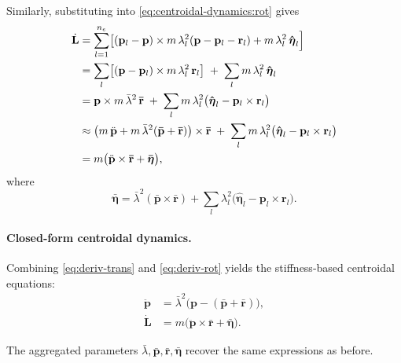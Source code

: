 \documentclass[main.tex]{subfiles}
\begin{document}
Similarly, substituting into \eqref{eq:centroidal‐dynamics:rot} gives
\begin{align}
\dot{\mathbf{L}}
&= \sum_{l=1}^{n_e}\bigl[(\mathbf{p}_l - \mathbf{p})\times m\,\lambda_l^2(\mathbf{p} - \mathbf{p}_l - \mathbf{r}_l) + m\,\lambda_l^2\,\mathbf{\hat{\boldsymbol{\eta}}}_l\Bigr]
\notag\\
&= \sum_{l}\bigl[(\mathbf{p} - \mathbf{p}_l)\times m\,\lambda_l^2\,\mathbf{r}_l\bigr]
   \;+\;\sum_{l}m\,\lambda_l^2\,\mathbf{\hat{\boldsymbol{\eta}}}_l
\notag\\
&= \mathbf{p} \times m\,\bar\lambda^2\,\mathbf{\bar{r}}
   \;+\;\sum_{l}m\,\lambda_l^2\bigl(\mathbf{\hat{\boldsymbol{\eta}}}_l - \mathbf{p}_l\times \mathbf{r}_l\bigr)
\notag\\
&\approx \bigl(m\,\ddot{\mathbf{p}} + m\,\bar\lambda^2(\mathbf{\bar{p}}+\mathbf{\bar{r}})\bigr)\times \mathbf{\bar{r}}
   \;+\;\sum_{l}m\,\lambda_l^2\bigl(\mathbf{\hat{\boldsymbol{\eta}}}_l - \mathbf{p}_l\times \mathbf{r}_l\bigr)
\notag\\
&= m\bigl(\ddot{\mathbf{p}}\times \mathbf{\bar{r}} + \mathbf{\bar{\boldsymbol{\eta}}}\bigr),
\label{eq:deriv‐rot}
\end{align}
where
\[
\mathbf{\bar{\boldsymbol{\eta}}}
= \bar\lambda^2(\mathbf{\bar{p}}\times \mathbf{\bar{r}})
  + \sum_{l}\lambda_l^2\bigl(\mathbf{\hat{\boldsymbol{\eta}}}_l - \mathbf{p}_l\times \mathbf{r}_l\bigr).
\]

\medskip
\paragraph{Closed‐form centroidal dynamics.}
Combining \eqref{eq:deriv‐trans} and \eqref{eq:deriv‐rot} yields the stiffness‐based centroidal equations:
\begin{subequations}\label{eq:stiff‐centroidal}
\begin{align}
\ddot{\mathbf{p}} &= \bar\lambda^2\bigl(\mathbf{p} - (\mathbf{\bar{p}} + \mathbf{\bar{r}})\bigr),
\label{eq:stiff‐centroidal:trans}\\
\dot{\mathbf{L}} &= m\bigl(\ddot{\mathbf{p}} \times \mathbf{\bar{r}} + \mathbf{\bar{\boldsymbol{\eta}}}\bigr).
\label{eq:stiff‐centroidal:rot}
\end{align}
\end{subequations}
 
\noindent
The aggregated parameters $\bar\lambda,\mathbf{\bar{p}},\mathbf{\bar{r}},\mathbf{\bar{\boldsymbol{\eta}}}$ recover the same expressions as before. 
\end{document}

